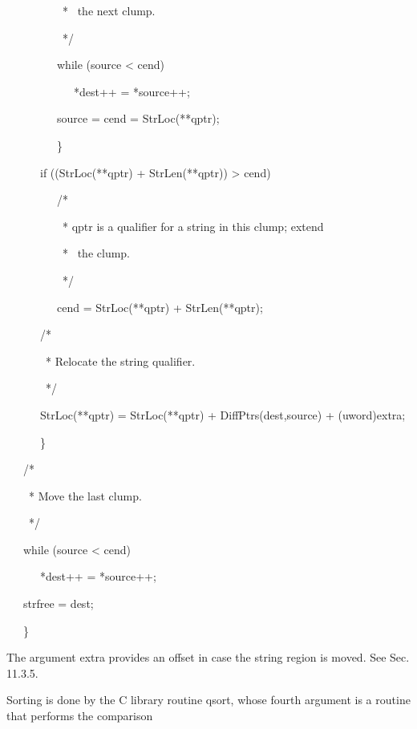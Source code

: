 {\ttfamily\mdseries
\ \ \ \ \ \ \ \ \ \ * \ the next clump.
}

{\ttfamily\mdseries
\ \ \ \ \ \ \ \ \ \ */
}

{\ttfamily\mdseries
\ \ \ \ \ \ \ \ \ while (source {\textless} cend)
}

{\ttfamily\mdseries
\ \ \ \ \ \ \ \ \ \ \ \ *dest++ = *source++;
}

{\ttfamily\mdseries
\ \ \ \ \ \ \ \ \ source = cend = StrLoc(**qptr);
}

{\ttfamily\mdseries
\ \ \ \ \ \ \ \ \ \}
}

{\ttfamily\mdseries
\ \ \ \ \ \ if ((StrLoc(**qptr) + StrLen(**qptr)) {\textgreater} cend)
}

{\ttfamily\mdseries
\ \ \ \ \ \ \ \ \ /*
}

{\ttfamily\mdseries
\ \ \ \ \ \ \ \ \ \ * qptr is a qualifier for a string in this clump; extend}

{\ttfamily\mdseries
\ \ \ \ \ \ \ \ \ \ * \ the clump.
}

{\ttfamily\mdseries
\ \ \ \ \ \ \ \ \ \ */
}

{\ttfamily\mdseries
\ \ \ \ \ \ \ \ \ cend = StrLoc(**qptr) + StrLen(**qptr);
}

{\ttfamily\mdseries
\ \ \ \ \ \ /*
}

{\ttfamily\mdseries
\ \ \ \ \ \ \ * Relocate the string qualifier.
}

{\ttfamily\mdseries
\ \ \ \ \ \ \ */
}

{\ttfamily\mdseries
\ \ \ \ \ \ StrLoc(**qptr) = StrLoc(**qptr) + DiffPtrs(dest,source) + (uword)extra;}

{\ttfamily\mdseries
\ \ \ \ \ \ \}
}


\bigskip

{\ttfamily\mdseries
\ \ \ /*
}

{\ttfamily\mdseries
\ \ \ \ * Move the last clump.
}

{\ttfamily\mdseries
\ \ \ \ */
}

{\ttfamily\mdseries
\ \ \ while (source {\textless} cend)
}

{\ttfamily\mdseries
\ \ \ \ \ \ *dest++ = *source++;
}

{\ttfamily\mdseries
\ \ \ strfree = dest;
}

{\ttfamily\mdseries
\ \ \ \}}

The argument extra provides an offset in case the string region is
moved. See Sec. 11.3.5.

Sorting is done by the C library routine qsort, whose fourth argument
is a routine that performs the comparison

